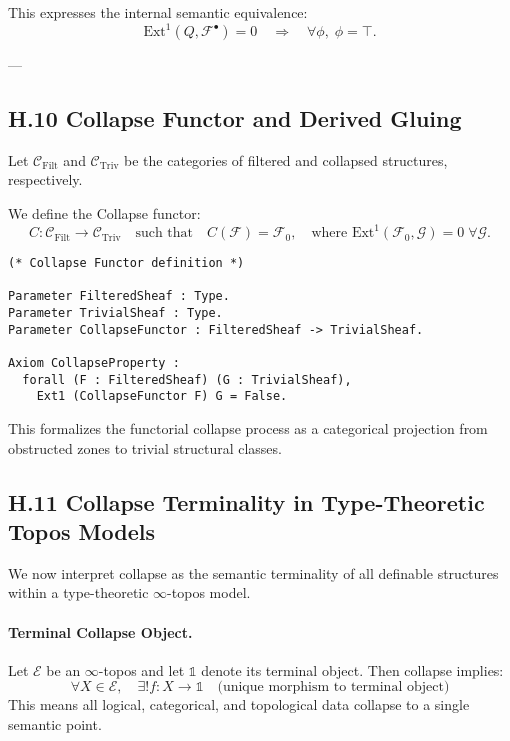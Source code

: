 \documentclass[11pt]{article}
\begin{document}
This expresses the internal semantic equivalence:
\[
\mathrm{Ext}^1(Q, \mathcal{F}^\bullet) = 0 \quad \Rightarrow \quad \forall \phi, \; \phi = \top.
\]

---

\subsection*{H.10 Collapse Functor and Derived Gluing}

Let \( \mathcal{C}_\mathrm{Filt} \) and \( \mathcal{C}_\mathrm{Triv} \) be the categories of filtered and collapsed structures, respectively.

We define the Collapse functor:
\[
C : \mathcal{C}_\mathrm{Filt} \longrightarrow \mathcal{C}_\mathrm{Triv}
\quad \text{such that} \quad
C(\mathcal{F}) = \mathcal{F}_0, \quad \text{where } \mathrm{Ext}^1(\mathcal{F}_0, \mathcal{G}) = 0 \; \forall \mathcal{G}.
\]

\begin{lstlisting}[language=Coq, caption=Collapse Functor Typing]
(* Collapse Functor definition *)

Parameter FilteredSheaf : Type.
Parameter TrivialSheaf : Type.
Parameter CollapseFunctor : FilteredSheaf -> TrivialSheaf.

Axiom CollapseProperty :
  forall (F : FilteredSheaf) (G : TrivialSheaf),
    Ext1 (CollapseFunctor F) G = False.
\end{lstlisting}

This formalizes the functorial collapse process as a categorical projection from obstructed zones to trivial structural classes.


\subsection*{H.11 Collapse Terminality in Type-Theoretic Topos Models}

We now interpret collapse as the semantic terminality of all definable structures  
within a type-theoretic $\infty$-topos model.

\paragraph{Terminal Collapse Object.}
Let $\mathcal{E}$ be an $\infty$-topos and let $\mathbb{1}$ denote its terminal object.  
Then collapse implies:
\[
\forall X \in \mathcal{E}, \quad \exists ! f: X \to \mathbb{1}
\quad \text{(unique morphism to terminal object)}
\]
This means all logical, categorical, and topological data collapse to a single semantic point.
\end{document}
